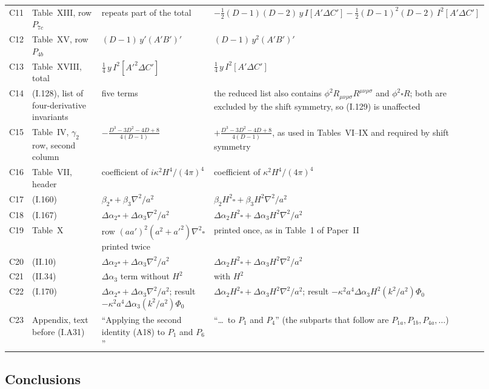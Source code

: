 \documentclass[aps,prd,onecolumn,10pt,nofootinbib,floatfix]{revtex4-2}
\newcommand{\eqI}[1]{(I.#1)}
\newcommand{\eqII}[1]{(II.#1)}
\begin{document}
\begin{table}[tbp]
\begin{ruledtabular}
\begin{tabular}{@{}l>{\raggedright\arraybackslash}p{0.19\linewidth}>{\raggedright\arraybackslash}p{0.30\linewidth}%
>{\raggedright\arraybackslash}p{0.43\linewidth}@{}}
C11 & Table~XIII, row $P_{7c}$ & repeats part of the total &
$-\tfrac12(D-1)(D-2)\,y\,I[A'\Delta C']-\tfrac12(D-1)^2(D-2)\,I^2[A'\Delta C']$\\
C12 & Table~XV, row $P_{4b}$ & $(D-1)\,y'(A'B')'$ & $(D-1)\,y^2(A'B')'$\\
C13 & Table~XVIII, total & $\tfrac14\,y\,I^2[A'^2\Delta C']$ & $\tfrac14\,y\,I^2[A'\Delta C']$\\
C14 & \eqI{128}, list of four-derivative invariants & five terms &
the reduced list also contains $\phi^2R_{\mu\nu\rho\sigma}R^{\mu\nu\rho\sigma}$ and $\phi^2\square R$; both are excluded by the shift
symmetry, so \eqI{129} is unaffected\\
C15 & Table~IV, $\gamma_2$ row, second column & $-\frac{D^3-3D^2-4D+8}{4(D-1)}$ &
$+\frac{D^3-3D^2-4D+8}{4(D-1)}$, as used in Tables~VI--IX and required by shift symmetry\\
C16 & Table~VII, header & coefficient of $i\kappa^2H^4/(4\pi)^4$ & coefficient of $\kappa^2H^4/(4\pi)^4$\\
C17 & \eqI{160} & $\beta_2\square+\beta_3\nabla^2/a^2$ & $\beta_2H^2\square+\beta_3H^2\nabla^2/a^2$\\
C18 & \eqI{167} & $\Delta\alpha_2\square+\Delta\alpha_3\nabla^2/a^2$ & $\Delta\alpha_2H^2\square+\Delta\alpha_3H^2\nabla^2/a^2$\\
C19 & Table~X & row $(aa')^2(a^2+a'^2)\nabla^2\square$ printed twice & printed once, as in Table~1 of Paper~II\\
C20 & \eqII{10} & $\Delta\alpha_2\square+\Delta\alpha_3\nabla^2/a^2$ & $\Delta\alpha_2H^2\square+\Delta\alpha_3H^2\nabla^2/a^2$\\
C21 & \eqII{34} & $\Delta\alpha_3$ term without $H^2$ & with $H^2$\\
C22 & \eqI{170} & $\Delta\alpha_2\square+\Delta\alpha_3\nabla^2/a^2$; result $-\kappa^2a^4\Delta\alpha_3(k^2/a^2)\Phi_0$ &
$\Delta\alpha_2H^2\square+\Delta\alpha_3H^2\nabla^2/a^2$; result $-\kappa^2a^4\Delta\alpha_3H^2(k^2/a^2)\Phi_0$\\
C23 & Appendix, text before \eqI{A31} & ``Applying the second identity (A18) to $P_1$ and $P_6$'' &
``\ldots\ to $P_1$ and $P_4$'' (the subparts that follow are $P_{1a},P_{1b},P_{4a},\dots$)\\
\end{tabular}
\end{ruledtabular}
\end{table}

\subsection{Conclusions}
\end{document}

